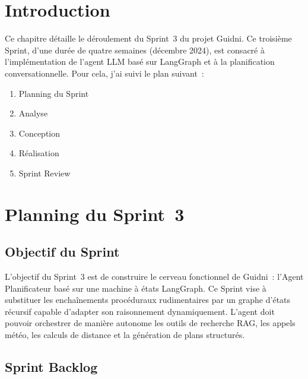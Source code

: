 
\section{Introduction}

Ce chapitre détaille le déroulement du Sprint~3 du projet Guidni. Ce troisième Sprint, d'une
durée de quatre semaines (décembre 2024), est consacré à l'implémentation de l'agent LLM
basé sur LangGraph et à la planification conversationnelle. Pour cela, j'ai suivi le plan
suivant~:
\begin{enumerate}
    \item Planning du Sprint
    \item Analyse
    \item Conception
    \item Réalisation
    \item Sprint Review
\end{enumerate}


\section{Planning du Sprint~3}

\subsection{Objectif du Sprint}

L'objectif du Sprint~3 est de construire le cerveau fonctionnel de Guidni~: l'Agent
Planificateur basé sur une machine à états LangGraph. Ce Sprint vise à substituer les
enchaînements procéduraux rudimentaires par un graphe d'états récursif capable d'adapter son
raisonnement dynamiquement. L'agent doit pouvoir orchestrer de manière autonome les outils de
recherche RAG, les appels météo, les calculs de distance et la génération de plans structurés.

\subsection{Sprint Backlog}

